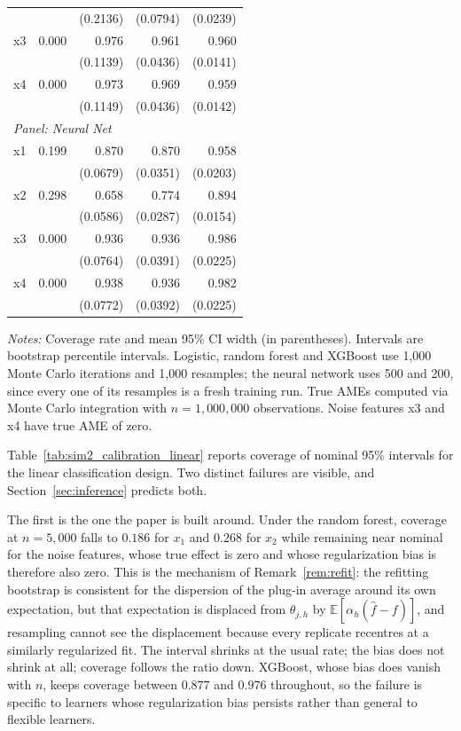 \documentclass[12pt]{article}
\newcommand{\E}{\mathbb{E}}
\begin{document}
\begin{table}[htbp]
\begin{threeparttable}
\begin{tabular}{lrrrr}
				&  & (0.2136) & (0.0794) & (0.0239) \\
				\quad x3 & 0.000 & 0.976 & 0.961 & 0.960 \\
				&  & (0.1139) & (0.0436) & (0.0141) \\
				\quad x4 & 0.000 & 0.973 & 0.969 & 0.959 \\
				&  & (0.1149) & (0.0436) & (0.0142) \\
				\midrule
				\multicolumn{5}{l}{\textit{Panel: Neural Net}} \\
				\quad x1 & 0.199 & 0.870 & 0.870 & 0.958 \\
				&  & (0.0679) & (0.0351) & (0.0203) \\
				\quad x2 & 0.298 & 0.658 & 0.774 & 0.894 \\
				&  & (0.0586) & (0.0287) & (0.0154) \\
				\quad x3 & 0.000 & 0.936 & 0.936 & 0.986 \\
				&  & (0.0764) & (0.0391) & (0.0225) \\
				\quad x4 & 0.000 & 0.938 & 0.936 & 0.982 \\
				&  & (0.0772) & (0.0392) & (0.0225) \\
				\bottomrule
				\end{tabular}
				\begin{tablenotes}
				\footnotesize
				\item \textit{Notes:} Coverage rate and mean 95\% CI width (in parentheses). Intervals are bootstrap percentile intervals. Logistic, random forest and XGBoost use 1{,}000 Monte Carlo iterations and 1{,}000 resamples; the neural network uses 500 and 200, since every one of its resamples is a fresh training run. True AMEs computed via Monte Carlo integration with $n=1{,}000{,}000$ observations. Noise features x3 and x4 have true AME of zero.
				\end{tablenotes}
		\end{threeparttable}
	\end{table}
	
	Table~\ref{tab:sim2_calibration_linear} reports coverage of nominal 95\% intervals for the linear classification design. Two distinct failures are visible, and Section~\ref{sec:inference} predicts both.
	
	The first is the one the paper is built around. Under the random forest, coverage at $n=5{,}000$ falls to $0.186$ for $x_1$ and $0.268$ for $x_2$ while remaining near nominal for the noise features, whose true effect is zero and whose regularization bias is therefore also zero. This is the mechanism of Remark~\ref{rem:refit}: the refitting bootstrap is consistent for the dispersion of the plug-in average around its own expectation, but that expectation is displaced from $\theta_{j,h}$ by $\E[\alpha_h(\hat f - f)]$, and resampling cannot see the displacement because every replicate recentres at a similarly regularized fit. The interval shrinks at the usual rate; the bias does not shrink at all; coverage follows the ratio down. XGBoost, whose bias does vanish with $n$, keeps coverage between $0.877$ and $0.976$ throughout, so the failure is specific to learners whose regularization bias persists rather than general to flexible learners.
	
\end{document}
